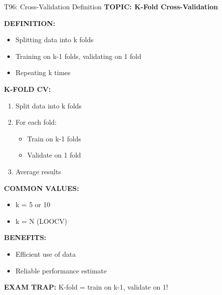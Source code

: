 \documentclass[8pt]{beamer}
\begin{document}
	\begin{frame}{T96: Cross-Validation Definition}
		\fontsize{6.5}{7.5}\selectfont
		\textbf{TOPIC: K-Fold Cross-Validation}
		
		\vspace{0.1cm}
		\textbf{DEFINITION:}
		\begin{itemize}
			\item Splitting data into k folds
			\item Training on k-1 folds, validating on 1 fold
			\item Repeating k times
		\end{itemize}
		
		\vspace{0.1cm}
		\textbf{K-FOLD CV:}
		\begin{enumerate}
			\item Split data into k folds
			\item For each fold:
			\begin{itemize}
				\item Train on k-1 folds
				\item Validate on 1 fold
			\end{itemize}
			\item Average results
		\end{enumerate}
		
		\vspace{0.1cm}
		\textbf{COMMON VALUES:}
		\begin{itemize}
			\item k = 5 or 10
			\item k = N (LOOCV)
		\end{itemize}
		
		\vspace{0.1cm}
		\textbf{BENEFITS:}
		\begin{itemize}
			\item Efficient use of data
			\item Reliable performance estimate
		\end{itemize}
		
		\textcolor{myred}{\textbf{EXAM TRAP:}} K-fold = train on \textcolor{myblue}{k-1}, validate on \textcolor{myblue}{1}!
	\end{frame}
	
\end{document}
